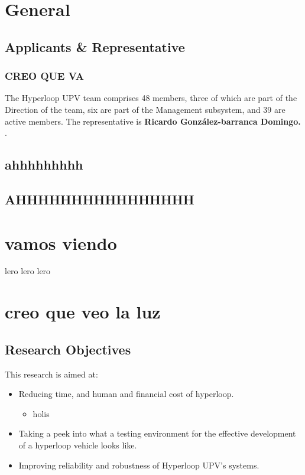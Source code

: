 
\chapter{General}

\section{Applicants \& Representative}
\subsection{CREO QUE VA}
The Hyperloop UPV team comprises 48 members, three of which are part of the Direction of the team, six are part of the Management subsystem, and 39 are active members. The representative is \textbf{Ricardo González-barranca Domingo.} \Nombre.

\section{ahhhhhhhhh}

\section{AHHHHHHHHHHHHHHHH}
\chapter{vamos viendo}
\Tubo lero lero lero

\chapter{creo que veo la luz}
\section{Research Objectives}

This research is aimed at:
\begin{itemize}
    \item Reducing time, and human and financial cost of hyperloop.
    \begin{itemize}
        \item holis
    \end{itemize}
    \item Taking a peek into what a testing environment for the effective development of a hyperloop vehicle looks like.
    \item Improving reliability and robustness of Hyperloop UPV’s systems. 
\\
    \lipsum[10]
\end{itemize}
\lipsum[100]
\lipsum[100]
\lipsum[100]
\lipsum[100]